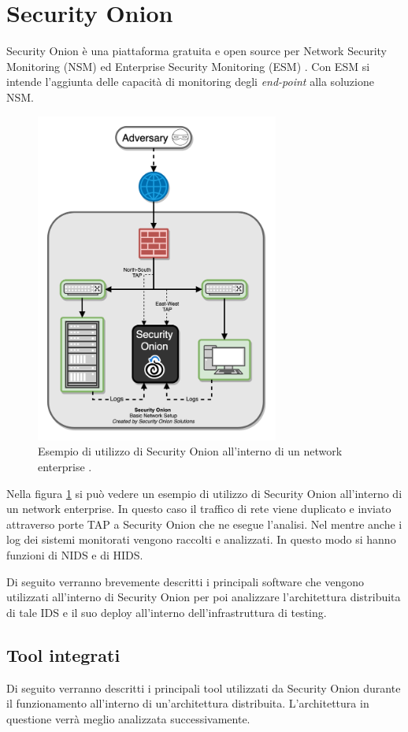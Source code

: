 \section{Security Onion}
Security Onion \cite{secOnion} è   una  piattaforma gratuita e open source per Network Security Monitoring (NSM) ed Enterprise Security Monitoring (ESM) \cite{secOnionDoc}.
Con  ESM si intende l'aggiunta delle capacità di  monitoring degli \textit{end-point} alla soluzione NSM.
\begin{figure}[hbtp]
    \centering
    \includegraphics[width=8cm]{res/fig/SecOnionExample1.png}
    \caption{Esempio di utilizzo di Security Onion all'interno di un network enterprise \cite{SecOnionFig1}.}
    \label{fig:seconionexample}
\end{figure}

Nella figura \ref{fig:seconionexample} si può vedere un esempio di utilizzo di Security Onion all'interno di un network enterprise.
In questo caso il traffico di rete viene duplicato e inviato attraverso porte TAP a Security Onion che ne esegue l'analisi. Nel mentre anche i log dei sistemi monitorati vengono raccolti e analizzati. In questo modo si hanno funzioni di NIDS e di HIDS.

Di seguito verranno brevemente descritti i principali software che vengono utilizzati all'interno di Security Onion per poi analizzare l'architettura distribuita di tale IDS e il suo deploy all'interno dell'infrastruttura di testing.

\subsection{Tool integrati}
Di seguito verranno descritti i principali tool utilizzati da Security Onion durante il funzionamento all'interno di un'architettura distribuita. L'architettura in questione verrà meglio analizzata successivamente.

